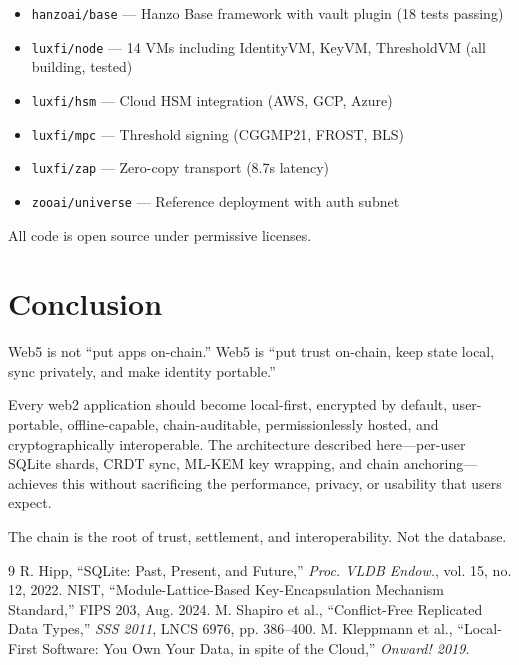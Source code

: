 \documentclass[twocolumn,11pt]{article}
\begin{document}
\begin{itemize}
\item \texttt{hanzoai/base} --- Hanzo Base framework with vault plugin (18 tests passing)
\item \texttt{luxfi/node} --- 14 VMs including IdentityVM, KeyVM, ThresholdVM (all building, tested)
\item \texttt{luxfi/hsm} --- Cloud HSM integration (AWS, GCP, Azure)
\item \texttt{luxfi/mpc} --- Threshold signing (CGGMP21, FROST, BLS)
\item \texttt{luxfi/zap} --- Zero-copy transport (8.7\textmu{}s latency)
\item \texttt{zooai/universe} --- Reference deployment with auth subnet
\end{itemize}

All code is open source under permissive licenses.

\section{Conclusion}

Web5 is not ``put apps on-chain.'' Web5 is ``put trust on-chain, keep state local, sync privately, and make identity portable.''

Every web2 application should become local-first, encrypted by default, user-portable, offline-capable, chain-auditable, permissionlessly hosted, and cryptographically interoperable. The architecture described here---per-user SQLite shards, CRDT sync, ML-KEM key wrapping, and chain anchoring---achieves this without sacrificing the performance, privacy, or usability that users expect.

The chain is the root of trust, settlement, and interoperability. Not the database.


\begin{thebibliography}{9}
 R. Hipp, ``SQLite: Past, Present, and Future,'' \textit{Proc. VLDB Endow.}, vol. 15, no. 12, 2022.
 NIST, ``Module-Lattice-Based Key-Encapsulation Mechanism Standard,'' FIPS 203, Aug. 2024.
 M. Shapiro et al., ``Conflict-Free Replicated Data Types,'' \textit{SSS 2011}, LNCS 6976, pp. 386--400.
 M. Kleppmann et al., ``Local-First Software: You Own Your Data, in spite of the Cloud,'' \textit{Onward! 2019}.
\end{thebibliography}
\end{document}
